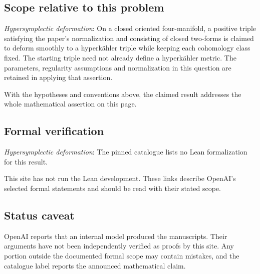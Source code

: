 \documentclass[11pt]{article}
\begin{document}
\subsection{Scope relative to this problem}
\textit{Hypersymplectic deformation}: On a closed oriented four-manifold, a positive triple satisfying the paper’s normalization and consisting of closed two-forms is claimed to deform smoothly to a hyperkähler triple while keeping each cohomology class fixed. The starting triple need not already define a hyperkähler metric. The parameters, regularity assumptions and normalization in this question are retained in applying that assertion.

With the hypotheses and conventions above, the claimed result addresses the whole mathematical assertion on this page.

\subsection{Formal verification}
\textit{Hypersymplectic deformation}: The pinned catalogue lists no Lean formalization for this result.

This site has not run the Lean development. These links describe OpenAI’s selected formal statements and should be read with their stated scope.

\subsection{Status caveat}
OpenAI reports that an internal model produced the manuscripts. Their arguments have not been independently verified as proofs by this site. Any portion outside the documented formal scope may contain mistakes, and the catalogue label reports the announced mathematical claim.
\end{document}
